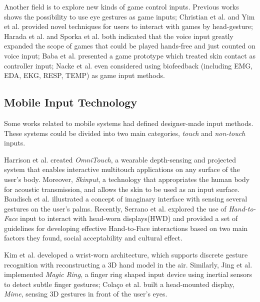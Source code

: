 \documentclass{sigchi}
\begin{document}
    Another field is to explore new kinds of game control inputs. Previous works\cite{Ekman:2008:IEU:1358628.1358820,Vickers:2013:PLT:2531922.2514856,Sundstedt:2010:GGU:1837101.1837106,Smith:2006:UEM:1178823.1178847} shows the possibility to use eye gestures as game inputs; Christian et al.\cite{Christian:2014:VSI:2559206.2580103} and Yim et al.\cite{Yim:2008:EDD:1496984.1497033} provided novel techniques for users to interact with games by head-gesture; Harada et al.\cite{Harada:2011:VGI:2042053.2042059} and Sporka et al. \cite{Sporka:2006:NIS:1168987.1169023} both indicated that the voice input greatly expanded the scope of games that could be played hands-free and just counted on voice input; Baba et al.\cite{Baba:2007:VGU:1278280.1278285} presented a game prototype which treated skin contact as controller input; Nacke et al.\cite{Nacke:2011:BGD:1978942.1978958} even considered using biofeedback (including EMG, EDA, EKG, RESP, TEMP) as game input methods.


    \subsection{Mobile Input Technology}
    Some works related to mobile systems had defined designer-made input methods. These systems could be divided into two main categories, \emph{touch} and \emph{non-touch} inputs. 

    Harrison et al.\cite{Harrison:2011:OWM:2047196.2047255} created \textsl{OmniTouch}, a wearable depth-sensing and projected system that enables interactive multitouch applications on any surface of the user's body. Moreover, \textsl{Skinput}\cite{Harrison:2010:SAB:1753326.1753394}, a technology that appropriates the human body for acoustic transmission, and allows the skin to be used as an input surface. Baudisch et al.\cite{Gustafson:2011:IPL:2047196.2047233} illustrated a concept of imaginary interface with sensing several gestures on the user's palms. Recently, Serrano et al.\cite{Serrano:2014:EUH:2611247.2556984} explored the use of \textsl{Hand-to-Face} input to interact with head-worn displays(HWD) and provided a set of guidelines for developing effective Hand-to-Face interactions based on two main factors they found, social acceptability and cultural effect.

    Kim et al.\cite{Kim:2012:DFI:2380116.2380139} developed a wrist-worn architecture, which supports discrete gesture recognition with reconstructing a 3D hand model in the air. Similarly, Jing et al.\cite{Jing:2013:MRS:2541831.2541875} implemented \textsl{Magic Ring}, a finger ring shaped input device using inertial sensors to detect subtle finger gestures; Cola\c{c}o et al.\cite{Colaco:2013:MCL:2501988.2502042} built a head-mounted display, \textsl{Mime}, sensing 3D gestures in front of the user's eyes. 
\end{document}
